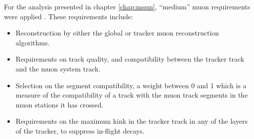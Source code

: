 For the analysis presented in chapter \ref{chap:mssm}, ``medium'' muon requirements were applied \cite{CMS-PAS-HIG-16-037}.
These requirements include:
\begin{itemize}
\setlength{\itemsep}{-\baselineskip}
\item Reconstruction by either the global or tracker muon reconstruction algorithms.
\item Requirements on track quality, and compatibility between the tracker track and the muon system track.
\item Selection on the segment compatibility, a weight between 0 and 1 which is a measure of the compatibility
of a track with the muon track segments in the muon stations it has crossed.
\item Requirements on the maximum kink in the tracker track in any of the layers of the tracker, to suppress in-flight decays.
\end{itemize}
